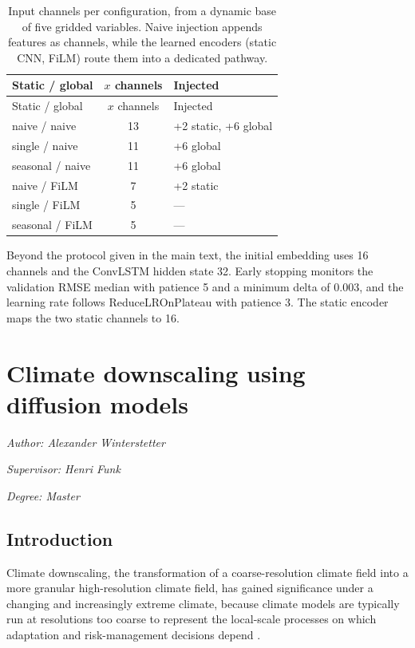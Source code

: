 \documentclass[
]{krantz}
\begin{document}
\begin{longtable}[]{@{}lcl@{}}
\caption{\label{tab:dp-input-channels} Input channels per configuration, from a dynamic base of five gridded variables. Naive injection appends features as channels, while the learned encoders (static CNN, FiLM) route them into a dedicated pathway.}\tabularnewline
\toprule\noalign{}
Static / global & \(x\) channels & Injected \\
\midrule\noalign{}
\endfirsthead
\toprule\noalign{}
Static / global & \(x\) channels & Injected \\
\midrule\noalign{}
\endhead
\bottomrule\noalign{}
\endlastfoot
naive / naive & 13 & +2 static, +6 global \\
single / naive & 11 & +6 global \\
seasonal / naive & 11 & +6 global \\
naive / FiLM & 7 & +2 static \\
single / FiLM & 5 & --- \\
seasonal / FiLM & 5 & --- \\
\end{longtable}

Beyond the protocol given in the main text, the initial embedding uses 16 channels and the ConvLSTM hidden state 32.
Early stopping monitors the validation RMSE median with patience 5 and a minimum delta of 0.003, and the learning rate follows ReduceLROnPlateau with patience 3.
The static encoder maps the two static channels to 16.

\chapter{Climate downscaling using diffusion models}\label{ddm}

\emph{Author: Alexander Winterstetter}

\emph{Supervisor: Henri Funk}

\emph{Degree: Master}

\section{Introduction}\label{introduction-1}

Climate downscaling, the transformation of a coarse-resolution climate field into a more granular high-resolution climate field, has gained significance under a changing and increasingly extreme climate, because
climate models are typically run at resolutions too coarse to represent the local-scale processes on which adaptation and risk-management decisions depend \citep{ling2024, merizzi2024}.
\end{document}
